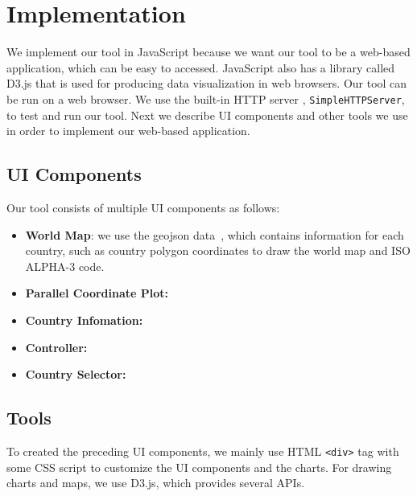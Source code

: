 \section{Implementation}
We implement our tool in JavaScript because we want our tool to be a web-based application, which can be easy to accessed. JavaScript also has a library called D3.js that is used for producing data visualization in web browsers. Our tool can be run on a web browser. We use the built-in HTTP server , \texttt{SimpleHTTPServer}, to test and run our tool. Next we describe UI components and other tools we use in order to implement our web-based application.
\subsection{UI Components}
Our tool consists of multiple UI components as follows:
\begin{itemize}
	\item \textbf{World Map}: we use the geojson data~\cite{geocountries}, which contains information for each country, such as country polygon coordinates to draw the world map and ISO ALPHA-3 code.
	\item \textbf{Parallel Coordinate Plot:}
    \item \textbf{Country Infomation:}
	\item \textbf{Controller:}
    \item \textbf{Country Selector:}
\end{itemize}

\subsection{Tools}
To created the preceding UI components, we mainly use HTML \texttt{<div>} tag with some CSS script to customize the UI components and the charts. For drawing charts and maps, we use D3.js, which provides several APIs.
